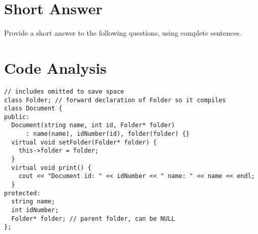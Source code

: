 \documentclass[11pt,answers]{exam}
\begin{document}
\begin{questions}

\newpage
\section*{Short Answer}

\question Provide a short answer to the following questions, using complete sentences.


\newpage

\section*{Code Analysis}

\begin{parts}
\begin{lstlisting}
// includes omitted to save space
class Folder; // forward declaration of Folder so it compiles
class Document {
public:
  Document(string name, int id, Folder* folder)
      : name(name), idNumber(id), folder(folder) {}
  virtual void setFolder(Folder* folder) {
    this->folder = folder;
  }
  virtual void print() {
    cout << "Document id: " << idNumber << " name: " << name << endl;
  }
protected:
  string name;
  int idNumber;
  Folder* folder; // parent folder, can be NULL
};


\end{lstlisting}
\end{parts}
\end{questions}
\end{document}
